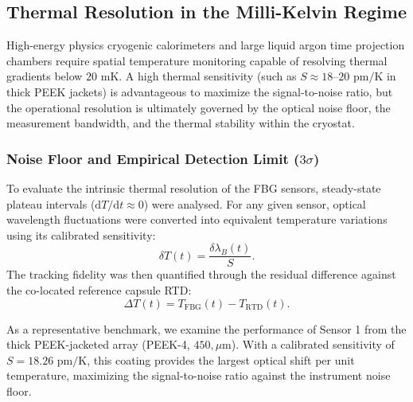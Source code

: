\documentclass[12pt]{article}
\begin{document}
\subsection{Thermal Resolution in the Milli-Kelvin Regime}
\label{subsec:millikelvin_resolution}

High-energy physics cryogenic calorimeters and large liquid argon time projection chambers require spatial temperature monitoring capable of resolving thermal gradients below $20\text{ mK}$. A high thermal sensitivity (such as $S \approx 18\text{--}20\text{ pm/K}$ in thick PEEK jackets) is advantageous to maximize the signal-to-noise ratio, but the operational resolution is ultimately governed by the optical noise floor, the measurement bandwidth, and the thermal stability within the cryostat.

\subsubsection{Noise Floor and Empirical Detection Limit ($3\sigma$)}

To evaluate the intrinsic thermal resolution of the FBG sensors, steady-state plateau intervals ($\mathrm{d}T/\mathrm{d}t \approx 0$) were analysed. For any given sensor, optical wavelength fluctuations were converted into equivalent temperature variations using its calibrated sensitivity:
\begin{equation}
    \delta T(t) = \frac{\delta \lambda_B(t)}{S}.
    \label{eq:delta_T_conversion}
\end{equation}
The tracking fidelity was then quantified through the residual difference against the co-located reference capsule RTD:
\begin{equation}
    \Delta T(t) = T_{\mathrm{FBG}}(t) - T_{\mathrm{RTD}}(t).
    \label{eq:residual_def}
\end{equation}

As a representative benchmark, we examine the performance of Sensor 1 from the thick PEEK-jacketed array (PEEK-4, $450,\mu\mathrm{m}$). With a calibrated sensitivity of $S = 18.26\text{ pm/K}$, this coating provides the largest optical shift per unit temperature, maximizing the signal-to-noise ratio against the instrument noise floor.
\end{document}
